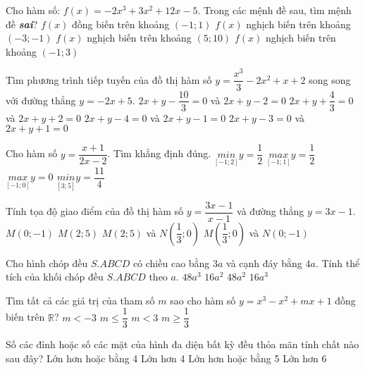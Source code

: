 \begin{ex}%
Cho hàm số: $f(x)=-2x^3+3x^2+12x-5$. Trong các mệnh đề sau, tìm mệnh đề \textit{\textbf{sai}}?
\choice
{$f(x)$ đồng biến trên khoảng $(-1;1)$}
{$f(x)$ nghịch biến trên khoảng $(-3;-1)$}
{$f(x)$ nghịch biến trên khoảng $(5;10)$}
{\True $f(x)$ nghịch biến trên khoảng $(-1;3)$}
\end{ex}
\begin{ex}%
Tìm phương trình tiếp tuyến của đồ thị hàm số $y=\dfrac{x^3}{3}-2x^2+x+2$ song song với đường thẳng $y=-2x+5$.
\choice
{\True $2x+y-\dfrac{10}{3}=0$ và $2x+y-2=0$}
{$2x+y+\dfrac{4}{3}=0$ và $2x+y+2=0$}
{$2x+y-4=0$ và $2x+y-1=0$}
{$2x+y-3=0$ và $2x+y+1=0$}
\end{ex}
\begin{ex}%
Cho hàm số $y=\dfrac{x+1}{2x-2}$. Tìm khẳng định đúng.
\choice
{$\underset{[-1;2]}{min} y=\dfrac{1}{2}$}
{$\underset{[-1;1]}{max} y=\dfrac{1}{2}$}
{\True $\underset{[-1;0]}{max} y=0$}
{$\underset{[3;5]}{min} y=\dfrac{11}{4}$}
\end{ex}
\begin{ex}%
Tính tọa độ giao điểm của đồ thị hàm số $y=\dfrac{3x-1}{x-1}$ và đường thẳng $y=3x-1$.
\choice
{$M(0;-1)$}
{$M(2;5)$}
{\True $M(2;5)$ và $N\left(\dfrac{1}{3};0\right)$}
{$M\left(\dfrac{1}{3};0\right)$ và $N(0;-1)$}
\end{ex}
\begin{ex}%
Cho hình chóp đều $S.ABCD$ có chiều cao bằng $3a$ và cạnh đáy bằng $4a$. Tính thể tích của khối chóp đều $S.ABCD$ theo $a$.
\choice
{$48a^3$}
{$16a^2$}
{$48a^2$}
{\True $16a^3$}
\end{ex}
\begin{ex}%
Tìm tất cả các giá trị của tham số $m$ sao cho hàm số $y=x^3-x^2+mx+1$ đồng biến trên $\mathbb{R}$?
\choice
{$m<-3$}
{$m \le \dfrac{1}{3}$}
{$m<3$}
{\True $m\ge \dfrac{1}{3}$}
\end{ex}
\begin{ex}%
Số các đỉnh hoặc số các mặt của hình đa diện bất kỳ đều thỏa mãn tính chất nào sau đây?
\choice
{\True Lớn hơn hoặc bằng 4}
{Lớn hơn 4}
{Lớn hơn hoặc bằng 5}
{Lớn hơn 6}
\end{ex}
